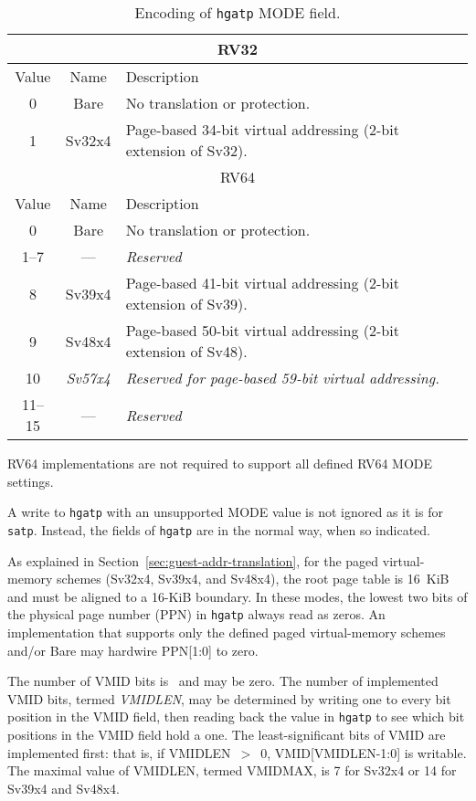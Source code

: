 \begin{table}[h]
\begin{center}
\begin{tabular}{|c|c|l|}
\hline
\multicolumn{3}{|c|}{RV32} \\
\hline
Value  & Name & Description \\
\hline
0      & Bare   & No translation or protection. \\
1      & Sv32x4 & Page-based 34-bit virtual addressing (2-bit extension of Sv32). \\
\hline \hline
\multicolumn{3}{|c|}{RV64} \\
\hline
Value  & Name & Description \\
\hline
0      & Bare   & No translation or protection. \\
1--7   & ---    & {\em Reserved} \\
8      & Sv39x4 & Page-based 41-bit virtual addressing (2-bit extension of Sv39). \\
9      & Sv48x4 & Page-based 50-bit virtual addressing (2-bit extension of Sv48). \\
10     & {\em Sv57x4} & {\em Reserved for page-based 59-bit virtual addressing.} \\
11--15 & ---    & {\em Reserved} \\
\hline
\end{tabular}
\end{center}
\caption{Encoding of {\tt hgatp} MODE field.}
\label{tab:hgatp-mode}
\end{table}

RV64 implementations are not required to support all defined RV64 MODE
settings.

A write to {\tt hgatp} with an unsupported MODE value is not ignored as it is
for {\tt satp}.
Instead, the fields of {\tt hgatp} are {\warl} in the normal way, when so
indicated.

As explained in Section~\ref{sec:guest-addr-translation}, for the paged
virtual-memory schemes (Sv32x4, Sv39x4, and Sv48x4), the root page table is
16~KiB and must be aligned to a 16-KiB boundary.
In these modes, the lowest two bits of the physical page number (PPN) in
{\tt hgatp} always read as zeros.
An implementation that supports only the defined paged virtual-memory schemes
and/or Bare may hardwire PPN[1:0] to zero.

The number of VMID bits is \unspecified\ and may be zero.
The number of implemented VMID bits, termed {\mbox {\em VMIDLEN}}, may be
determined by writing one to every bit position in the VMID field, then reading
back the value in {\tt hgatp} to see which bit positions in the VMID field hold
a one.
The least-significant bits of VMID are implemented first:
that is, if VMIDLEN~$>$~0, VMID[VMIDLEN-1:0] is writable.
The maximal value of VMIDLEN, termed VMIDMAX, is 7 for Sv32x4 or 14 for Sv39x4
and Sv48x4.

